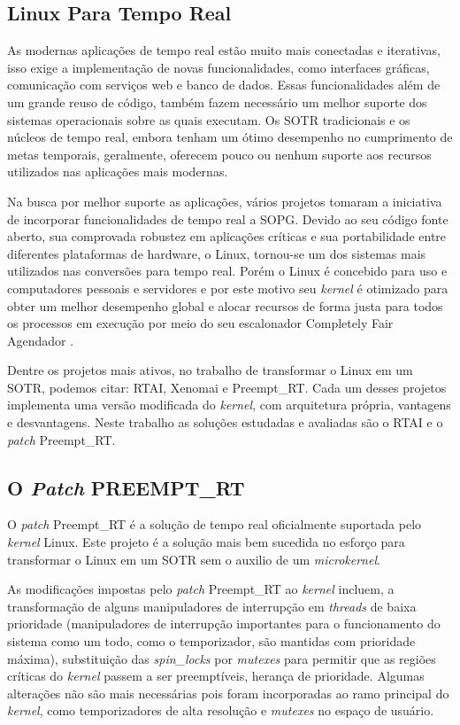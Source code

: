 \subsection{Linux Para Tempo Real}
As modernas aplicações de tempo real estão muito mais conectadas e iterativas, isso exige a implementação de novas funcionalidades, como interfaces gráficas, comunicação com serviços web e banco de dados. Essas funcionalidades além de um grande reuso de código, também fazem necessário um melhor suporte dos sistemas operacionais sobre as quais executam. Os SOTR tradicionais e os núcleos de tempo real, embora tenham um ótimo desempenho no cumprimento de metas temporais, geralmente, oferecem pouco ou nenhum suporte aos recursos utilizados nas aplicações mais modernas.

Na busca por melhor suporte as aplicações, vários projetos tomaram a iniciativa de incorporar funcionalidades de tempo real a SOPG. Devido ao seu código fonte aberto, sua comprovada robustez em aplicações críticas e sua portabilidade entre diferentes plataformas de hardware, o Linux, tornou-se um dos sistemas mais utilizados nas conversões para tempo real. Porém o Linux é concebido para uso e computadores pessoais e servidores e por este motivo seu \textit{kernel} é otimizado para obter um melhor desempenho global e alocar recursos de forma justa para todos os processos em execução por meio do seu escalonador Completely Fair Agendador \cite{cfs}. 

Dentre os projetos mais ativos, no trabalho de transformar o Linux em um SOTR, podemos citar: RTAI, Xenomai e Preempt\_RT. Cada um desses projetos implementa uma versão modificada do \textit{kernel}, com arquitetura própria, vantagens e desvantagens. Neste trabalho as soluções estudadas e avaliadas são o RTAI e o \textit{patch} Preempt\_RT.

\subsection{O \textit{Patch} PREEMPT\_RT}
O \textit{patch} Preempt\_RT é a solução de tempo real oficialmente suportada pelo \textit{kernel} Linux. Este projeto é a solução mais bem sucedida no esforço para transformar o Linux em um SOTR sem o auxilio de um \textit{microkernel}.

As modificações impostas pelo \textit{patch} Preempt\_RT ao \textit{kernel} incluem, a transformação de alguns manipuladores de interrupção em \textit{threads} de baixa prioridade (manipuladores de interrupção importantes para o funcionamento do sistema como um todo, como o temporizador, são mantidas com prioridade máxima), substituição das \textit{spin\_locks} por \textit{mutexes} para permitir que as regiões críticas do \textit{kernel} passem a ser preemptíveis, herança de prioridade. Algumas alterações não são mais necessárias pois foram incorporadas ao ramo principal do \textit{kernel}, como temporizadores de alta resolução e \textit{mutexes} no espaço de usuário.

